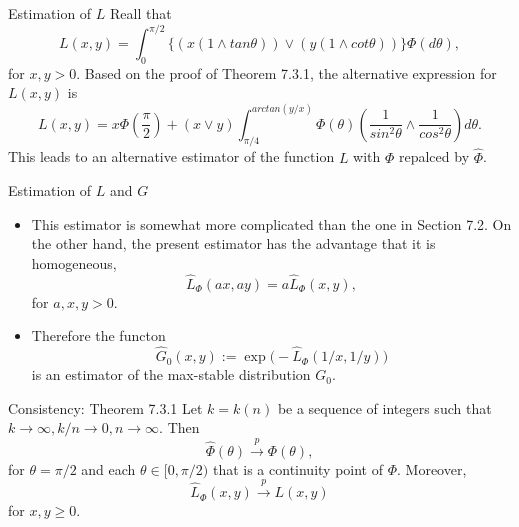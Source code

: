 \documentclass[11pt]{beamer}
\begin{document}
\begin{frame}{Estimation of $L$}
Reall that
\begin{displaymath}
L(x,y)=\int_0^{\pi/2} \{     (x(1\land tan\theta))\lor (y(1\land cot \theta))                    \} \Phi(d\theta),
\end{displaymath}
for $x,y>0$. 
Based on the proof of Theorem 7.3.1, the alternative expression for $L(x,y)$ is
\begin{displaymath}
L(x,y)=x\Phi(\frac{\pi}{2}) +(x\lor y)\int_{\pi/4}^{arctan(y/x)} \Phi(\theta)(\frac{1}{sin^2 \theta} \land \frac{1}{cos^2 \theta} )d\theta.
\end{displaymath}
This leads to an alternative estimator of the function $L$ with $\Phi$ repalced by $\hat{\Phi}$.
\end{frame}
\begin{frame}{Estimation of $L$ and $G$}
\begin{itemize}
\item This estimator is somewhat more complicated than the one in Section 7.2. On the other hand,  the present estimator has the advantage that it is homogeneous,
\begin{displaymath}
\hat{L}_{\Phi}(ax,ay)=a\hat{L}_{\Phi}(x,y),
\end{displaymath}
for $a,x,y>0$.
\item Therefore the functon
\begin{displaymath}
\hat{G}_0(x,y):=\exp\big(-\hat{L}_{\Phi}(1/x,1/y)\big)
\end{displaymath}
is an estimator of the max-stable distribution $G_0$.
\end{itemize}

\end{frame}
\begin{frame}{Consistency: Theorem 7.3.1}
Let $k=k(n)$ be a sequence of integers such that $k\to \infty, k/n\to 0, n\to \infty$. Then
\begin{displaymath}
\hat{\Phi}(\theta)\stackrel{p}{\to} \Phi(\theta),
\end{displaymath}
for $\theta=\pi/2$ and each $\theta \in [0,\pi/2)$ that is a continuity point of $\Phi$. Moreover,
\begin{displaymath}
\hat{L}_{\Phi}(x,y) \stackrel{p}{\to}L(x,y)
\end{displaymath}
for $x,y\ge 0$.
\end{frame}
\end{document}
